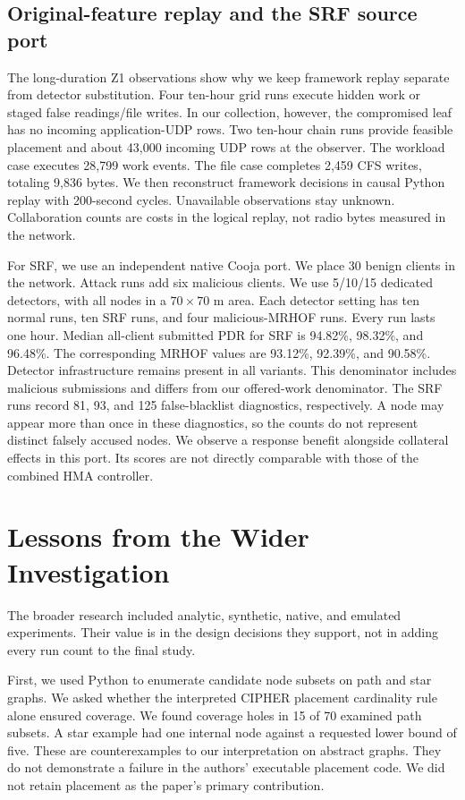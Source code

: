 \documentclass[journal]{IEEEtran}
\begin{document}
\subsection{Original-feature replay and the SRF source port}
The long-duration Z1 observations show why we keep framework replay separate from detector substitution. Four ten-hour grid runs execute hidden work or staged false readings/file writes. In our collection, however, the compromised leaf has no incoming application-UDP rows. Two ten-hour chain runs provide feasible placement and about 43,000 incoming UDP rows at the observer. The workload case executes 28,799 work events. The file case completes 2,459 CFS writes, totaling 9,836 bytes. We then reconstruct framework decisions in causal Python replay with 200-second cycles. Unavailable observations stay unknown. Collaboration counts are costs in the logical replay, not radio bytes measured in the network.

For SRF, we use an independent native Cooja port. We place 30 benign clients in the network. Attack runs add six malicious clients. We use 5/10/15 dedicated detectors, with all nodes in a $70\times70$ m area. Each detector setting has ten normal runs, ten SRF runs, and four malicious-MRHOF runs. Every run lasts one hour. Median all-client submitted PDR for SRF is 94.82\%, 98.32\%, and 96.48\%. The corresponding MRHOF values are 93.12\%, 92.39\%, and 90.58\%. Detector infrastructure remains present in all variants. This denominator includes malicious submissions and differs from our offered-work denominator. The SRF runs record 81, 93, and 125 false-blacklist diagnostics, respectively. A node may appear more than once in these diagnostics, so the counts do not represent distinct falsely accused nodes. We observe a response benefit alongside collateral effects in this port. Its scores are not directly comparable with those of the combined HMA controller.

\section{Lessons from the Wider Investigation}
The broader research included analytic, synthetic, native, and emulated experiments. Their value is in the design decisions they support, not in adding every run count to the final study.

First, we used Python to enumerate candidate node subsets on path and star graphs. We asked whether the interpreted CIPHER placement cardinality rule alone ensured coverage. We found coverage holes in 15 of 70 examined path subsets. A star example had one internal node against a requested lower bound of five. These are counterexamples to our interpretation on abstract graphs. They do not demonstrate a failure in the authors' executable placement code. We did not retain placement as the paper's primary contribution.
\end{document}
